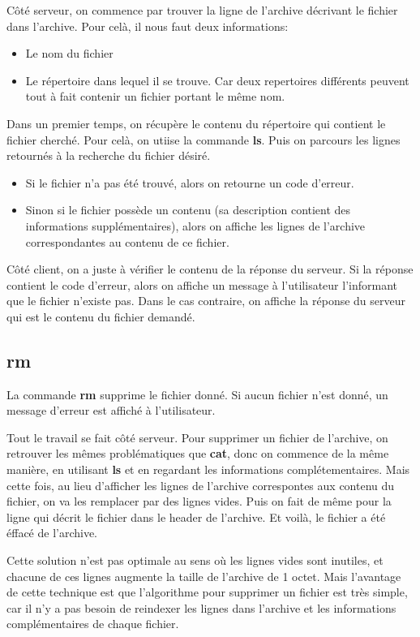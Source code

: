 \documentclass[titlepage]{article}
\begin{document}
	Côté serveur, on commence par trouver la ligne de l'archive décrivant le fichier dans l'archive. Pour celà, il nous faut deux informations:
	\begin{itemize}  
		\item Le nom du fichier   
		\item Le répertoire dans lequel il se trouve. Car deux repertoires différents peuvent tout à fait contenir un fichier portant le même nom.   
	\end{itemize}

	Dans un premier temps, on récupère le contenu du répertoire qui contient le fichier cherché. Pour celà, on utiise la commande \textbf{ls}. Puis on parcours les lignes retournés à la recherche du fichier désiré.

	\begin{itemize}
		\item Si le fichier n'a pas été trouvé, alors on retourne un code d'erreur.
		\item Sinon si le fichier possède un contenu (sa description contient des informations supplémentaires), alors on affiche les lignes de l'archive correspondantes au contenu de ce fichier.
	\end{itemize}

	Côté client, on a juste à vérifier le contenu de la réponse du serveur. Si la réponse contient le code d'erreur, alors on affiche un message à l'utilisateur l'informant que le fichier n'existe pas. Dans le cas contraire, on affiche la réponse du serveur qui est le contenu du fichier demandé.

	\subsection{rm}

	La commande \textbf{rm} supprime le fichier donné. Si aucun fichier n'est donné, un message d'erreur est affiché à l'utilisateur.

	Tout le travail se fait côté serveur. Pour supprimer un fichier de l'archive, on retrouver les mêmes problématiques que \textbf{cat}, donc on commence de la même manière, en utilisant \textbf{ls} et en regardant les informations complétementaires. Mais cette fois, au lieu d'afficher les lignes de l'archive correspontes aux contenu du fichier, on va les remplacer par des lignes vides. Puis on fait de même pour la ligne qui décrit le fichier dans le header de l'archive. Et voilà, le fichier a été éffacé de l'archive.

	Cette solution n'est pas optimale au sens où les lignes vides sont inutiles, et chacune de ces lignes augmente la taille de l'archive de 1 octet. Mais l'avantage de cette technique est que l'algorithme pour supprimer un fichier est très simple, car il n'y a pas besoin de reindexer les lignes dans l'archive et les informations complémentaires de chaque fichier.
\end{document}
